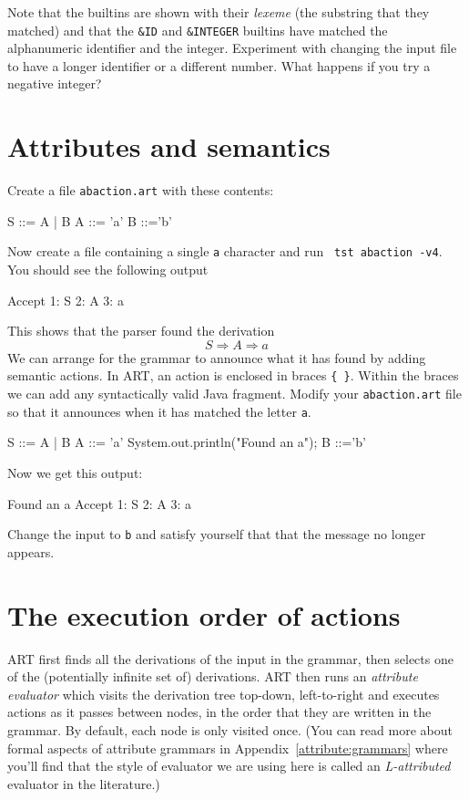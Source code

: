 Note that the builtins are shown with their {\em lexeme} (the substring that they matched) and that the \verb+&ID+
and \verb+&INTEGER+ builtins have matched the alphanumeric identifier
and the integer. Experiment with changing the input file to have a
longer identifier or a different number. What happens if you try a
negative integer?

\section{Attributes and semantics}
Create a file {\tt abaction.art} with these contents:
\begin{codeblock}
S ::= A | B
A ::= 'a'
B ::='b'
\end{codeblock}
Now create a file containing a single {\tt a} character and run {\tt
  tst abaction -v4}.
You should see the following output
\begin{codeblock}
Accept
1: S
  2: A
    3: a
\end{codeblock}
This shows that the parser found the derivation
\[S\Rightarrow A\Rightarrow a\]
We can arrange for the grammar to announce what it has found by adding
semantic actions. In ART, an action is enclosed in braces
\verb+{ }+. Within the braces we can add any syntactically valid Java
fragment.
Modify your {\tt abaction.art} file so that it announces when it has
matched the letter {\tt a}.
\begin{codeblock}
S ::= A | B
A ::= 'a' {System.out.println("Found an a");}
B ::='b'
\end{codeblock}
Now we get this output:
\begin{codeblock}
Found an a
Accept 
1: S
  2: A
    3: a
\end{codeblock}
Change the input to {\tt b} and satisfy yourself that that the
message no longer appears.

\section{The execution order of actions}
\label{abaction}
ART first finds all the derivations of the input in the
grammar, then selects one of the (potentially infinite set of)
derivations. ART then runs an {\em attribute evaluator} which visits the
derivation tree top-down, left-to-right and executes actions as it
passes between nodes, in the order that they are written in the
grammar. By default, each node is only visited once. (You can read more about formal aspects of attribute grammars in Appendix~\ref{attribute:grammars} where you'll find that the style of evaluator we are using here is called an {\em L-attributed} evaluator in the literature.)

